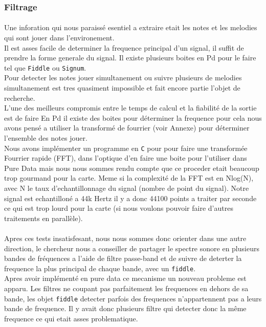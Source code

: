 \documentclass[a4paper, titlepage, oneside, 12pt]{article}%
\begin{document}
\subsubsection{Filtrage}
\paragraph{}
Une inforation qui nous paraissé esentiel a extraire etait les notes et les melodies qui sont jouer dans l'environement.\\
Il est asses facile de determiner la frequence principal d'un signal, il suffit de prendre la forme generale du signal. Il existe plusieurs boites en Pd pour le faire tel que \texttt{Fiddle} ou \texttt{Signum}.\\
Pour detecter les notes jouer simultanement ou suivre plusieurs de melodies simultanement est tres quasiment impossible et fait encore partie l'objet de recherche.\\
L'une des meilleurs compromis entre le temps de calcul et la fiabilité de la sortie est de faire 
En Pd il existe des boites pour déterminer la frequence pour cela nous avons pensé a utiliser la transformé de fourrier (voir Annexe) pour déterminer l'ensemble des notes jouer. \\
Nous avons implémenter un programme en \texttt{C} pour pour faire une transformée Fourrier rapide (FFT), dans l'optique d'en faire une boite pour l'utiliser dans Pure Data mais nous nous sommes rendu compte que ce proceder etait beaucoup trop gourmand pour la carte. Meme si la complexité de la FFT est en Nlog(N), avec N le taux d'echantillonnage du signal (nombre de point du signal). Notre signal est echantilloné a 44k Hertz il y a donc 44100 points a traiter par seconde ce qui est trop lourd pour la carte (si nous voulons pouvoir faire d'autres traitements en parallèle).

\paragraph{}

Apres ces tests insatisfesant, nous nous sommes donc orienter dans une autre direction, le chercheur nous a conseiller de partager le spectre sonore en plusieurs bandes de fréquences a l'aide de filtre passe-band et de suivre de deterter la frequence la plus principal de chaque bande, avec un \texttt{fiddle}.\\
Apres avoir implémenté en pure data ce mecanisme un nouveau probleme est apparu. Les filtres ne coupant pas parfaitement les frequences en dehors de sa bande, les objet \texttt{fiddle} detecter parfois des frequences n'appartennent pas a leurs bande de frequence. Il y avait donc plusieurs filtre qui detecter donc la même frequence ce qui etait asses problematique.\\
\end{document}

